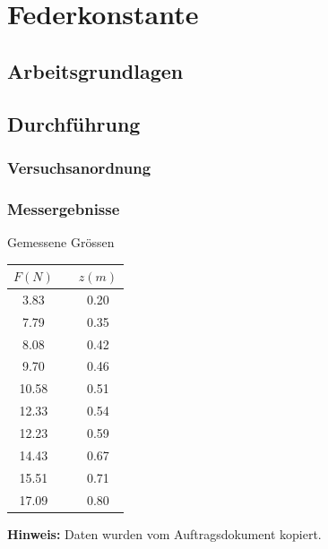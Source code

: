 \section{Federkonstante}

\subsection{Arbeitsgrundlagen}

\subsection{Durchf\"uhrung}

\subsubsection*{Versuchsanordnung}

\subsubsection*{Messergebnisse}

\begin{center}
    \begin{threeparttable}
        \caption{Gemessene Gr\"ossen}
        \begin{tabular}{ccc}
            \toprule
            $F (N)$ & \hspace{12mm} & $z (m)$ \\
            \midrule
            3.83  & & 0.20 \\
            7.79  & & 0.35 \\
            8.08  & & 0.42 \\
            9.70  & & 0.46 \\
            10.58 & & 0.51 \\
            12.33 & & 0.54 \\
            12.23 & & 0.59 \\
            14.43 & & 0.67 \\
            15.51 & & 0.71 \\
            17.09 & & 0.80 \\
            \bottomrule
        \end{tabular}
        \begin{tablenotes}
            \small
            \item \textbf{Hinweis:} Daten wurden vom Auftragsdokument kopiert.
        \end{tablenotes}
    \end{threeparttable}
\end{center}

